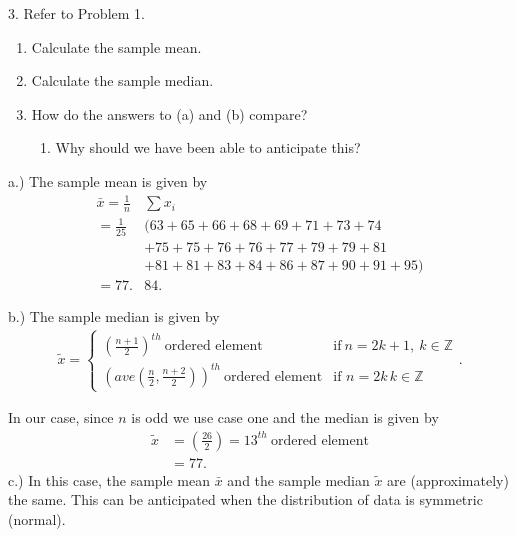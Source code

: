 \documentclass{report}
\begin{document}
    \pagebreak 
    \begin{mdframed}
        3. Refer to Problem 1.
        \begin{enumerate}[label=(\alph*)]
            \item  Calculate the sample mean. 
            \item Calculate the sample median. 
            \item How do the answers to (a) and (b) compare? 
                \begin{enumerate}[label=(\roman*)]
                    \item Why should we have been able to anticipate this?  
                \end{enumerate}
        \end{enumerate}
    \end{mdframed}
    \bigbreak \noindent 
    a.) The sample mean is given by
    \begin{align*}
        \bar{x} = \frac{1}{n}&\sum x_{i} \\
        =  \frac{1}{25}&(63+65+66+68+69+71+73+74 \\
                       &+75+75+76+76+77+79+79+81 \\
                       &+81+81+83+84+86+87+90+91+95) \\
        = 77.&84
    .\end{align*}
    \bigbreak \noindent 
    \begin{remark}
        b.) The sample median is given by 
        \begin{align*}
            \tilde{x}=
            \begin{cases}
                \left(\frac{n+1}{2}\right)^{th}\ \text{ordered element} &\text{if}\ n = 2k+1,\ k\in\mathbb{Z}   \\
                \left(ave\left(\frac{n}{2}, \frac{n+2}{2}\right)\right)^{th}\ \text{ordered element} & \text{if } n=2k\, k\in\mathbb{Z} 
            \end{cases}
        .\end{align*}
    \end{remark}
    \bigbreak \noindent 
     In our case, since $n$ is odd we use case one and the median is given by
    \begin{align*}
        \tilde{x} &= \left(\frac{26}{2}\right) = 13^{th}\ \text{ordered element}  \\
        &=77
    .\end{align*}
    \bigbreak \noindent 
    c.) In this case, the sample mean $\bar{x}$ and the sample median $\tilde{x}$ are (approximately) the same. This can be anticipated when the distribution of data is symmetric (normal).
    
\end{document}
